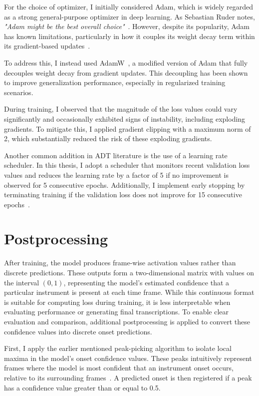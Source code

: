 For the choice of optimizer, I initially considered Adam, which is widely regarded as a strong general-purpose optimizer in deep learning. As Sebastian Ruder notes, \textit{"Adam might be the best overall choice"}~\cite{ruder2017overviewgradientdescentoptimization}. However, despite its popularity, Adam has known limitations, particularly in how it couples its weight decay term within its gradient-based updates~\cite{kingma2017adammethodstochasticoptimization, bock2018improvementconvergenceproofadamoptimizer}.

To address this, I instead used AdamW~\cite{loshchilov2019decoupledweightdecayregularization}, a modified version of Adam that fully decouples weight decay from gradient updates. This decoupling has been shown to improve generalization performance, especially in regularized training scenarios.

During training, I observed that the magnitude of the loss values could vary significantly and occasionally exhibited signs of instability, including exploding gradients. To mitigate this, I applied gradient clipping with a maximum norm of 2, which substantially reduced the risk of these exploding gradients.

Another common addition in \gls{ADT} literature is the use of a learning rate scheduler. In this thesis, I adopt a scheduler that monitors recent validation loss values and reduces the learning rate by a factor of 5 if no improvement is observed for 5 consecutive epochs. Additionally, I implement early stopping by terminating training if the validation loss does not improve for 15 consecutive epochs~\cite{chang2024yourmt3+, signals4040042}.

\section{Postprocessing}

After training, the model produces frame-wise activation values rather than discrete predictions. These outputs form a two-dimensional matrix with values on the interval $(0, 1)$, representing the model's estimated confidence that a particular instrument is present at each time frame. While this continuous format is suitable for computing loss during training, it is less interpretable when evaluating performance or generating final transcriptions. To enable clear evaluation and comparison, additional postprocessing is applied to convert these confidence values into discrete onset predictions.

First, I apply the earlier mentioned peak-picking algorithm to isolate local maxima in the model's onset confidence values. These peaks intuitively represent frames where the model is most confident that an instrument onset occurs, relative to its surrounding frames~\cite{Bck2012EvaluatingTO, vogl2018multiinstrumentdrumtranscription}. A predicted onset is then registered if a peak has a confidence value greater than or equal to 0.5.

